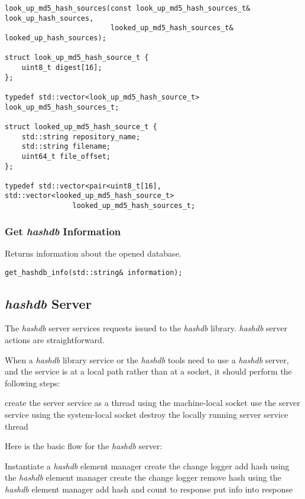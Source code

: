 \documentclass[12pt,twoside]{article}
\newcommand{\hdb}{\emph{hashdb}\xspace}
\begin{document}
\begin{small}
\begin{verbatim}
look_up_md5_hash_sources(const look_up_md5_hash_sources_t& look_up_hash_sources,
                         looked_up_md5_hash_sources_t& looked_up_hash_sources);

struct look_up_md5_hash_source_t {
    uint8_t digest[16];
};

typedef std::vector<look_up_md5_hash_source_t> look_up_md5_hash_sources_t;

struct looked_up_md5_hash_source_t {
    std::string repository_name;
    std::string filename;
    uint64_t file_offset;
};

typedef std::vector<pair<uint8_t[16], std::vector<looked_up_md5_hash_source_t>
                looked_up_md5_hash_sources_t;
\end{verbatim}
\end{small}

\subsubsection{Get \hdb Information}
Returns information about the opened database.

\begin{small}
\begin{verbatim}
get_hashdb_info(std::string& information);
\end{verbatim}
\end{small}

\subsection{\hdb Server}
The \hdb server services requests issued to the \hdb library.
\hdb server actions are straightforward.

When a \hdb library service or the \hdb tools need to use a \hdb server,
and the service is at a local path rather than at a socket,
it should perform the following steps:
\begin{algorithmic}
\STATE create the server service as a thread using the machine-local socket
\STATE use the server service using the system-local socket
\STATE destroy the locally running server service thread
\end{algorithmic}

Here is the basic flow for the \hdb server:
\begin{algorithmic}
\STATE Instantiate a \hdb element manager
    \STATE create the change logger
      \STATE add hash using the \hdb element manager
    \ENDWHILE
    \STATE create the change logger
      \STATE remove hash using the \hdb element manager
    \ENDWHILE
        \STATE add hash and count to response
      \ENDIF
    \ENDWHILE
    \STATE put info into response
  \ENDIF
\ENDWHILE
\end{algorithmic}
\end{document}
